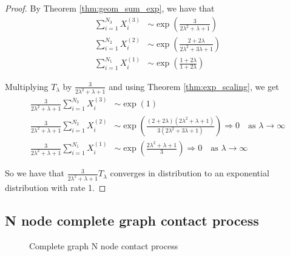 \documentclass{article}
\theoremstyle{plain}
\theoremstyle{definition}
\theoremstyle{remark}
\numberwithin{equation}{section}
\begin{document}
\begin{proof}
By Theorem \eqref{thm:geom_sum_exp}, we have that
\begin{align*}
    \sum_{i = 1}^{N_3} X_i^{(3)} &\sim \exp\left(
        \frac{3}{2\lambda^2 + \lambda + 1}
        \right) \\
    \sum_{i = 1}^{N_2} X_i^{(2)} &\sim \exp\left(
        \frac{2 + 2\lambda}{2 \lambda^2 + 3\lambda + 1}
    \right)\\
    \sum_{i = 1}^{N_1} X_i^{(1)} &\sim \exp\left(\frac{1 + 2\lambda}{1 + 2\lambda}\right)
\end{align*}

Multiplying $T_\lambda$ by $\frac{3}{2 \lambda^2 + \lambda + 1}$ and using Theorem \eqref{thm:exp_scaling}, we get
\begin{align*}
    \frac{3}{2 \lambda^2 + \lambda + 1} \sum_{i = 1}^{N_3} X_i^{(3)} &\sim \exp\left(
        1
        \right)\\
    \frac{3}{2 \lambda^2 + \lambda + 1} \sum_{i = 1}^{N_2} X_i^{(2)} &\sim \exp\left(
        \frac{(2 + 2\lambda)(2 \lambda^2 + \lambda + 1)}{3 (2 \lambda^2 + 3\lambda + 1)}
    \right)  \Rightarrow 0 \quad \text{as } \lambda \to \infty\\
    \frac{3}{2 \lambda^2 + \lambda + 1} \sum_{i = 1}^{N_1} X_i^{(1)} &\sim \exp\left(
    \frac{2 \lambda^2 + \lambda + 1}{3}
    \right) \Rightarrow 0 \quad \text{as } \lambda \to \infty
\end{align*}

So we have that $\frac{3}{2 \lambda^2 + \lambda + 1} T_\lambda$ converges in distribution to an exponential distribution with rate 1.
\end{proof}

\subsection{N node complete graph contact process}

\begin{figure}
    \centering
    \caption{Complete graph N node contact process}
    \label{fig:n_nodes_contact}
\end{figure}
\end{document}
